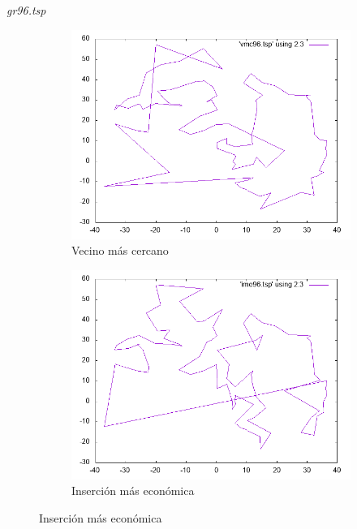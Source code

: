 \documentclass{beamer}
\begin{document}
\begin{frame}[fragile]{\textit{gr96.tsp}}
\begin{figure}[H]
\centering
\begin{subfigure}[b]{0.36\textwidth}
\includegraphics[width=\textwidth]{gr96_vmc.png}
\caption*{\small{Vecino más cercano}}
\end{subfigure}
\quad
\begin{subfigure}[b]{0.36\textwidth}
\includegraphics[width=\textwidth]{gr96_ime.png}
\caption*{\small{Inserción más económica}}
\end{subfigure}

\vspace{0.25cm}


\end{figure}
\end{frame}
\end{document}
